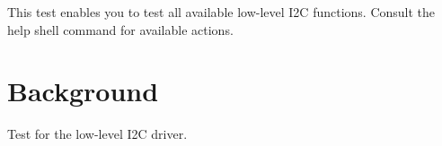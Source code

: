 This test enables you to test all available low-\/level I2C functions. Consult the \textquotesingle{}help\textquotesingle{} shell command for available actions.

\section*{Background }

Test for the low-\/level I2C driver. 